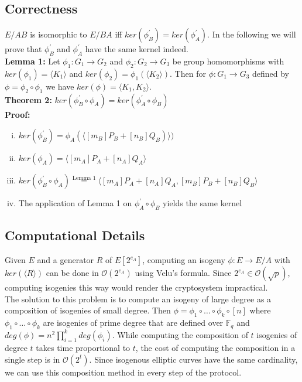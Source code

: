 \subsection{Correctness}
\label{ch:correctness}

$E/AB$ is isomorphic to $E/BA$ iff $ker(\phi_B^{\prime})=ker(\phi_A^{\prime})$. %
In the following we will prove that $\phi_B^{\prime}$ and $\phi_A^{\prime}$ have the same kernel indeed.\\

\textbf{Lemma 1:} Let $\phi_1: G_1 \to G_2$ and $\phi_2: G_2 \to G_3$ be group homomorphisms with $ker(\phi_1) = \langle K_1 \rangle$ and $ker(\phi_2) = \phi_1(\langle K_2 \rangle)$. Then for $\phi:G_1 \to G_3$ defined by $\phi=\phi_2 \circ \phi_1$ we have $ker(\phi) =\langle K_1,K_2\rangle$.\\%

\textbf{Theorem 2:} $ker(\phi_B^{\prime} \circ \phi_A) = ker(\phi_A^{\prime} \circ \phi_B)$\\
\textbf{Proof:}
\begin{enumerate}[(i)]
	\item $ker(\phi_B^{\prime})=\phi_A(\langle [m_B]P_B + [n_B]Q_B)\rangle)$
	\item $ker(\phi_A)=\langle [m_A]P_A + [n_A]Q_A\rangle$
	\item $ker(\phi_B^{\prime} \circ \phi_A) \stackrel{\text{Lemma 1}}{=} \langle [m_A]P_A + [n_A]Q_A, [m_B]P_B + [n_B]Q_B \rangle$
	\item The application of Lemma 1 on $\phi_A^{\prime} \circ \phi_B$ yields the same kernel
\end{enumerate}



\subsection{Computational Details}


Given $E$ and a generator $R$ of $E[2^{e_A}]$, computing an isogeny $\phi:E \to E/A$ with $ker(\langle R \rangle)$  can be done in $\mathcal{O}(2^{e_A})$ using Velu's formula. %
Since $2^{e_A} \in \mathcal{O}(\sqrt{p})$, computing isogenies this way would render the cryptosystem impractical.\\
	
The solution to this problem is to compute an isogeny of large degree as a composition of isogenies of small degree. Then $\phi = \phi_1 \circ \dots \circ \phi_k \circ [n]$ where $\phi_1 \circ \dots \circ \phi_k$ are isogenies of prime degree that are defined over $\mathbb{F}_q$ and $deg(\phi) = n^2 \prod^k_{i=1} deg(\phi_i)$. While computing the composition of $t$ isogenies of degree $t$ takes time proportional to $t$, the cost of computing the composition in a single step is in $\mathcal{O}(2^t)$. Since isogenous elliptic curves have the same cardinality, we can use this composition method in every step of the protocol.

